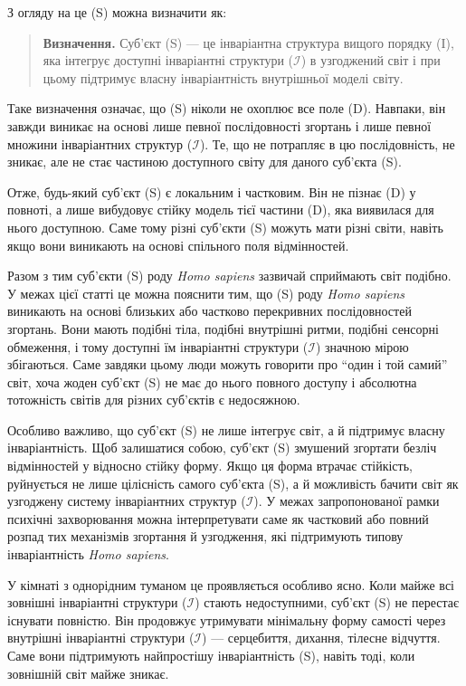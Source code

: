 \documentclass[aps,prd,onecolumn,nofootinbib,superscriptaddress]{revtex4-2}
\begin{document}
З огляду на це (S) можна визначити як:
\begin{quote}
\textbf{Визначення.}
Суб’єкт (S) — це інваріантна структура вищого порядку (I), яка інтегрує доступні інваріантні структури ($\mathcal{I}$) в узгоджений світ і при цьому підтримує власну інваріантність внутрішньої моделі світу.
\end{quote}

Таке визначення означає, що (S) ніколи не охоплює все поле (D). Навпаки, він завжди виникає на основі лише певної послідовності згортань і лише певної множини інваріантних структур ($\mathcal{I}$). Те, що не потрапляє в цю послідовність, не зникає, але не стає частиною доступного світу для даного суб’єкта (S).

Отже, будь-який суб’єкт (S) є локальним і частковим. Він не пізнає (D) у повноті, а лише вибудовує стійку модель тієї частини (D), яка виявилася для нього доступною. Саме тому різні суб’єкти (S) можуть мати різні світи, навіть якщо вони виникають на основі спільного поля відмінностей.

Разом з тим суб’єкти (S) роду \emph{Homo sapiens} зазвичай сприймають світ подібно. У межах цієї статті це можна пояснити тим, що (S) роду \emph{Homo sapiens} виникають на основі близьких або частково перекривних послідовностей згортань. Вони мають подібні тіла, подібні внутрішні ритми, подібні сенсорні обмеження, і тому доступні їм інваріантні структури ($\mathcal{I}$) значною мірою збігаються. Саме завдяки цьому люди можуть говорити про “один і той самий” світ, хоча жоден суб’єкт (S) не має до нього повного доступу і абсолютна тотожність світів для різних суб’єктів є недосяжною.

Особливо важливо, що суб’єкт (S) не лише інтегрує світ, а й підтримує власну інваріантність. Щоб залишатися собою, суб’єкт (S) змушений згортати безліч відмінностей у відносно стійку форму. Якщо ця форма втрачає стійкість, руйнується не лише цілісність самого суб’єкта (S), а й можливість бачити світ як узгоджену систему інваріантних структур ($\mathcal{I}$). У межах запропонованої рамки психічні захворювання можна інтерпретувати саме як частковий або повний розпад тих механізмів згортання й узгодження, які підтримують типову інваріантність \emph{Homo sapiens}.

У кімнаті з однорідним туманом це проявляється особливо ясно. Коли майже всі зовнішні інваріантні структури ($\mathcal{I}$) стають недоступними, суб’єкт (S) не перестає існувати повністю. Він продовжує утримувати мінімальну форму самості через внутрішні інваріантні структури ($\mathcal{I}$) — серцебиття, дихання, тілесне відчуття. Саме вони підтримують найпростішу інваріантність (S), навіть тоді, коли зовнішній світ майже зникає.
\end{document}
